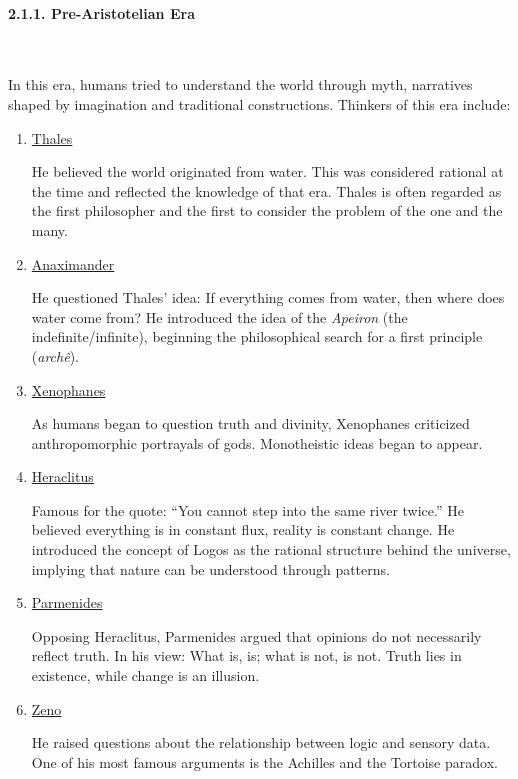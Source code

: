 \documentclass[12pt,a4paper]{book}
\begin{document}
\paragraph{2.1.1. Pre-Aristotelian Era}\label{pre-aristotelian-era}\

In this era, humans tried to understand the world through myth,
narratives shaped by imagination and traditional constructions. Thinkers
of this era include:

\begin{enumerate}

\item \href{https://en.wikipedia.org/wiki/Thales_of_Miletus}{Thales}
  
He believed the world originated from water. This was considered rational
at the time and reflected the knowledge of that era. Thales is often
regarded as the first philosopher and the first to consider the problem
of the one and the many.

\item \href{https://en.wikipedia.org/wiki/Anaximander}{Anaximander}
  
He questioned Thales' idea: If everything comes from water, then where
does water come from? He introduced the idea of the \emph{Apeiron} (the
indefinite/infinite), beginning the philosophical search for a first
principle (\emph{archê}).

\item \href{https://en.wikipedia.org/wiki/Xenophanes}{Xenophanes} 

As humans began to question truth and divinity, Xenophanes criticized
anthropomorphic portrayals of gods. Monotheistic ideas began to appear.

\item \href{https://en.wikipedia.org/wiki/Heraclitus}{Heraclitus}
  
Famous for the quote: ``You cannot step into the same river twice.'' He
believed everything is in constant flux, reality is constant change. He
introduced the concept of Logos as the rational structure behind the
universe, implying that nature can be understood through patterns.

\item \href{https://en.wikipedia.org/wiki/Parmenides}{Parmenides}

Opposing Heraclitus, Parmenides argued that opinions do not necessarily
reflect truth. In his view: What is, is; what is not, is not. Truth lies
in existence, while change is an illusion.

\item \href{https://simple.wikipedia.org/wiki/Zeno_of_Elea}{Zeno} 
 
He raised questions about the relationship between logic and sensory
data. One of his most famous arguments is the Achilles and the Tortoise
paradox.
\end{enumerate}
\end{document}
